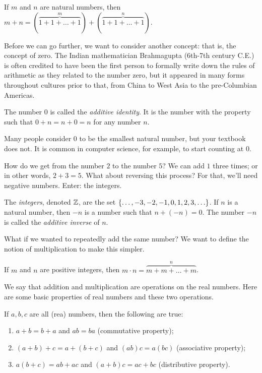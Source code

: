 \documentclass[boxes,serif]{seastaralgebras_expository}
\begin{document}
\begin{defn} \label{def:addition}
    If $m$ and $n$ are natural numbers, then $m + n = (\overbrace{1+1+\dots+1}^m) + (\overbrace{1+1+\dots+1}^n)$.
\end{defn}

Before we can go further, we want to consider another concept: that is, the concept of zero. The Indian mathematician Brahmagupta (6th-7th century C.E.) is often credited to have been the first person to formally write down the rules of arithmetic as they related to the number zero, but it appeared in many forms throughout cultures prior to that, from China to West Asia to the pre-Columbian Americas.

\begin{defn} \label{def:zero}
    The number $0$ is called the \emph{additive identity}. It is the number with the property such that $0+n = n+0 = n$ for any number $n$.
\end{defn}

\begin{note}
    Many people consider $0$ to be the smallest natural number, but your textbook does not. It is common in computer science, for example, to start counting at $0$.
\end{note}

How do we get from the number $2$ to the number $5$? We can add $1$ three times; or in other words, $2+3=5$. What about reversing this process? For that, we'll need negative numbers. Enter: the integers.

\begin{defn}\label{def:integers}
    The \emph{integers}, denoted $\mathbb{Z}$, are the set $\set{\dots, -3, -2, -1, 0, 1, 2, 3, \dots}$. If $n$ is a natural number, then $-n$ is a number such that $n + (-n) = 0$. The number $-n$ is called the \emph{additive inverse} of $n$.
\end{defn}

What if we wanted to repeatedly add the same number? We want to define the notion of multiplication to make this simpler.

\begin{defn} \label{def:multiplication}
    If $m$ and $n$ are positive integers, then $m\cdot n = \overbrace{m+m+\dots+m}^n$.
\end{defn}

We say that addition and multiplication are operations on the real numbers. Here are some basic properties of real numbers and these two operations.

\begin{proper} \label{proper:basic}
    If $a,b,c$ are all (rea) numbers, then the following are true:
    \begin{enumerate}
        \item $a+b = b+a$ and $ab = ba$ (commutative property);
        \item $(a+b) + c = a + (b+c)$ and $(ab)c=a(bc)$ (associative property);
        \item $a(b+c) = ab + ac$ and $(a+b)c = ac + bc$ (distributive property).
    \end{enumerate}
\end{proper}
\end{document}
